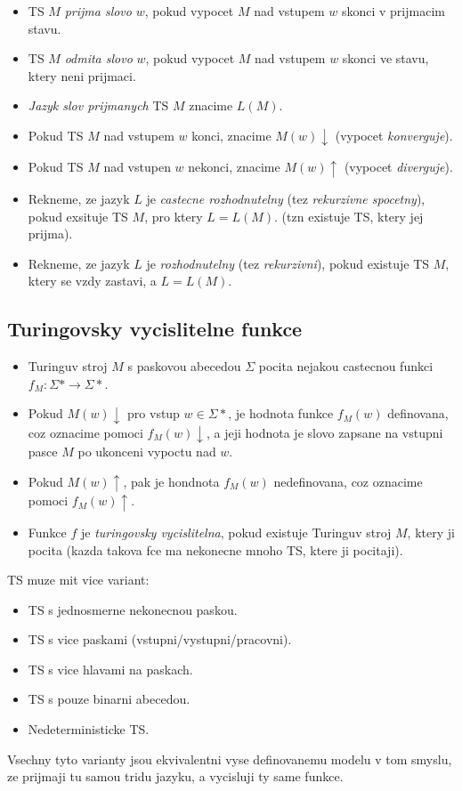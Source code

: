 \documentclass{article}
\theoremstyle{plain}
\theoremstyle{plain}
\theoremstyle{remark}
\begin{document}
\begin{itemize}
    \item TS $M$ \emph{prijma slovo} $w$, pokud vypocet $M$ nad vstupem $w$ skonci v prijmacim stavu.
    \item TS $M$ \emph{odmita slovo} $w$, pokud vypocet $M$ nad vstupem $w$ skonci ve stavu, ktery neni prijmaci.
    \item \emph{Jazyk slov prijmanych} TS $M$ znacime $L(M)$.
    \item Pokud TS $M$ nad vstupem $w$ konci, znacime $M(w)\downarrow$ (vypocet \emph{konverguje}).
    \item Pokud TS $M$ nad vstupen $w$ nekonci, znacime $M(w)\uparrow$ (vypocet \emph{diverguje}).
    \item Rekneme, ze jazyk $L$ je \emph{castecne rozhodnutelny} (tez \emph{rekurzivne spocetny}), pokud exsituje TS $M$, pro ktery $L = L(M)$. (tzn existuje TS, ktery jej prijma).
    \item Rekneme, ze jazyk $L$ je \emph{rozhodnutelny} (tez \emph{rekurzivni}), pokud existuje TS $M$, ktery se vzdy zastavi, a $L = L(M)$.
\end{itemize}

\subsection{Turingovsky vycislitelne funkce}

\begin{itemize}
    \item Turinguv stroj $M$ s paskovou abecedou $\Sigma$ pocita nejakou castecnou funkci $f_M : \Sigma* \rightarrow \Sigma*$.
    \item Pokud $M(w)\downarrow$ pro vstup $w \in \Sigma*$, je hodnota funkce $f_M(w)$ definovana, coz oznacime pomoci $f_M(w)\downarrow$, a jeji hodnota je slovo zapsane na vstupni pasce $M$ po ukonceni vypoctu nad $w$.
    \item Pokud $M(w)\uparrow$, pak je hondnota $f_M(w)$ nedefinovana, coz oznacime pomoci $f_M(w)\uparrow$.
    \item Funkce $f$ je \emph{turingovsky vycislitelna}, pokud existuje Turinguv stroj $M$, ktery ji pocita (kazda takova fce ma nekonecne mnoho TS, ktere ji pocitaji).
\end{itemize}

TS muze mit vice variant:

\begin{itemize}
    \item TS s jednosmerne nekonecnou paskou.
    \item TS s vice paskami (vstupni/vystupni/pracovni).
    \item TS s vice hlavami na paskach.
    \item TS s pouze binarni abecedou.
    \item Nedeterministicke TS.
\end{itemize}

Vsechny tyto varianty jsou ekvivalentni vyse definovanemu modelu v tom smyslu, ze prijmaji tu samou tridu jazyku, a vycisluji ty same funkce.
\end{document}
